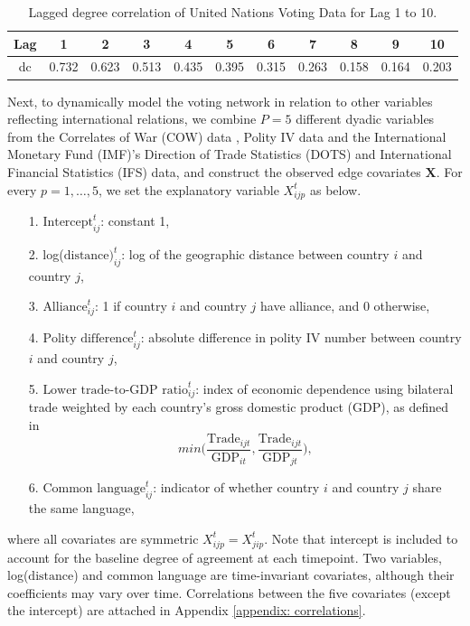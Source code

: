 \documentclass[a4paper]{article}
\begin{document}
\begin{table}[ht]
	\centering
	\begin{tabular}{ |c|c|c|c|c|c|c|c|c|c|c|} 
		\hline
		{Lag}	& 1 & 2& 3& 4& 5& 6& 7&8&9&10 \\ \hline
		dc & 0.732&0.623&0.513&0.435&0.395&0.315&0.263&0.158&0.164& 0.203\\\hline
	\end{tabular}
	\caption {Lagged degree correlation of United Nations Voting Data for Lag 1 to 10.}
	\label{table:corr}
\end{table}
\newline Next, to dynamically model the voting network in relation to other variables reflecting international relations, we combine $P=5$ different dyadic variables from the Correlates of War (COW) data \citep{gibler2008international}, Polity IV data \citep{marshall2014polity} and the International Monetary Fund (IMF)'s Direction of Trade Statistics (DOTS) and International Financial Statistics (IFS) data, and construct the observed edge covariates $\mathbf{X}$. For every $p=1,\ldots,5$, we set the explanatory variable $X^t_{ijp}$ as below.
\begin{itemize}
	\item [1.] $\mbox{Intercept}^t_{ij}$: constant 1,
	\item [2.] log($\mbox{distance})^t_{ij}$: log of the geographic distance between country $i$ and country $j$,
	\item [3.] $\mbox{Alliance}^t_{ij}$: 1 if country $i$ and country $j$ have alliance, and 0 otherwise,
	\item [4.] $\mbox{Polity difference}^t_{ij}$: absolute difference in polity IV number between country $i$ and country $j$,
	\item [5.] $\mbox{Lower trade-to-GDP ratio}^t_{ij}$: index of economic dependence using bilateral trade weighted by each country's gross domestic product (GDP), as defined in \cite{gartzke2000preferences} $$min\Big(\frac{\mbox{Trade}_{ijt}}{\mbox{GDP}_{it}}, \frac{\mbox{Trade}_{ijt}}{\mbox{GDP}_{jt}}\Big),$$
	\item [6.] $\mbox{Common language}^t_{ij}$: indicator of whether country $i$ and country $j$ share the same language,
\end{itemize}
where all covariates are symmetric $X^t_{ijp}=X^t_{jip}$. Note that intercept is included to account for the baseline degree of agreement at each timepoint. Two variables, log($\mbox{distance}$) and common language are time-invariant covariates, although their coefficients may vary over time. Correlations between the five covariates (except the intercept) are attached in Appendix \ref{appendix: correlations}.\\\newline
\end{document}
